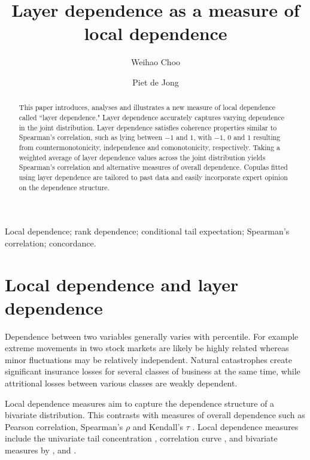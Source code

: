 \documentclass[authoryear]{elsarticle}
\begin{document}
\begin{frontmatter}

\title{Layer dependence as a measure of local dependence}
\author[acst]{Weihao Choo}
\author[acst]{Piet de Jong}



\address[acst]{Department of Actuarial Studies Macquarie
University, NSW 2109, Australia.}




\begin{abstract}
This paper introduces, analyses and  illustrates a new measure of local dependence called  ``layer dependence." Layer dependence accurately captures varying dependence in the joint distribution. Layer dependence satisfies coherence properties similar to Spearman's correlation, such as lying between $-1$ and $1$, with $-1$, $0$ and $1$ resulting from countermonotonicity, independence and comonotonicity, respectively. Taking a weighted average of layer dependence values across the joint distribution yields Spearman's correlation and alternative measures of overall dependence. Copulas fitted using layer dependence are tailored to past data and easily incorporate expert opinion on the dependence structure.
\end{abstract}

\begin{keyword}
Local dependence; rank dependence; conditional tail expectation; Spearman's correlation; concordance.
\end{keyword}



\end{frontmatter}

\section{Local dependence and layer dependence}

Dependence between two variables generally varies  with percentile. For example extreme movements in two stock markets are likely be highly related  whereas minor fluctuations may be relatively independent. Natural catastrophes create significant insurance losses for several classes of business at the same time, while attritional losses between various classes are weakly dependent.


Local dependence measures aim to capture the dependence structure of a bivariate distribution. This contrasts with  measures of overall dependence such as Pearson correlation, Spearman's $\rho$ and Kendall's $\tau$ \citep{embrechts2002correlation}. Local dependence measures include the univariate tail concentration \citep{venter2002tails}, correlation curve \citep{bjerve1993correlation}, and bivariate measures by \cite{bairamov2003new}, \cite{jones1996local} and \cite{holland1987dependence}.
\end{document}
